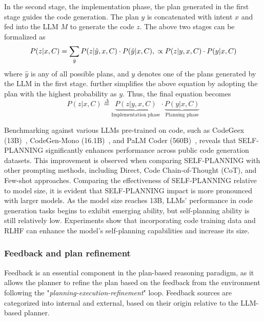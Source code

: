 In the second stage, the implementation phase, the plan generated in the first stage guides the code generation.
The plan $y$ is concatenated with intent $x$ and fed into the LLM $M$ to generate the code $z$.
The above two stages can be formalized as
\begin{equation}
	P(z|x, C) = \sum_{\hat{y}}{P(z|\hat{y}, x, C) \cdot P(\hat{y}|x, C)},\\
	\propto P(z|y, x, C) \cdot P(y|x, C)
	\label{eq:self-planning-all}
\end{equation}
where $\hat{y}$ is any of all possible plans, and $y$ denotes one of the plans generated by the LLM in the first stage.
\textcite{jiang2024selfplanning} further simplifies the above equation by adopting the plan with the highest probability as $y$. Thus, the final equation becomes
\begin{equation}
	P(z|x, C) \stackrel{\Delta}{=} \underbrace{P(z|y, x, C)}_\text{Implementation phase} \cdot \underbrace{P(y|x, C)}_\text{Planning phase}
	\label{eq:self-planning-final}
\end{equation}

Benchmarking against various LLMs pre-trained on code, such as CodeGeex (13B)~\cite{zheng2023codegeex}, CodeGen-Mono (16.1B)~\cite{nijkamp2022codegen}, and PaLM Coder (560B)~\cite{chung2022scaling}, reveals that SELF-PLANNING significantly enhances performance across public code generation datasets.
This improvement is observed when comparing SELF-PLANNING with other prompting methods, including Direct, Code Chain-of-Thought (CoT), and Few-shot approaches.
Comparing the effectiveness of SELF-PLANNING relative to model size, it is evident that SELF-PLANNING impact is more pronounced with larger models.
As the model size reaches 13B, LLMs' performance in code generation tasks begins to exhibit emerging ability, but self-planning ability is still relatively low.
Experiments show that incorporating code training data and RLHF can enhance the model’s self-planning capabilities and increase its size.

\subsubsection{Feedback and plan refinement}
\label{subsubsec:feedback}

Feedback is an essential component in the plan-based reasoning paradigm, as it allows the planner to refine the plan based on the feedback from the environment following the "\textit{planning-execution-refinement}" loop.
Feedback sources are categorized into internal and external, based on their origin relative to the LLM-based planner.

